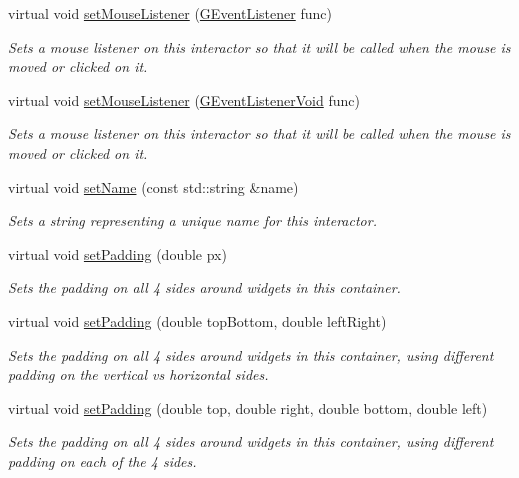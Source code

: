 \begin{DoxyCompactItemize}
virtual void \mbox{\hyperlink{classsgl_1_1GInteractor_a37d8dbc943f59920f705b0104f60bde2}{set\+Mouse\+Listener}} (\mbox{\hyperlink{namespacesgl_ae9f3e9eab70035da1a2b114e21357b25}{G\+Event\+Listener}} func)
\begin{DoxyCompactList}\small\item\em Sets a mouse listener on this interactor so that it will be called when the mouse is moved or clicked on it. \end{DoxyCompactList}\item 
virtual void \mbox{\hyperlink{classsgl_1_1GInteractor_aea7f647ea62d59f71b5fad6aa65eeaf9}{set\+Mouse\+Listener}} (\mbox{\hyperlink{namespacesgl_a54427ce97bb1c2804e4fe2b0a62e8b17}{G\+Event\+Listener\+Void}} func)
\begin{DoxyCompactList}\small\item\em Sets a mouse listener on this interactor so that it will be called when the mouse is moved or clicked on it. \end{DoxyCompactList}\item 
virtual void \mbox{\hyperlink{classsgl_1_1GInteractor_a9d3a2685df23b5e7cbf59c19c4a1f9b5}{set\+Name}} (const std\+::string \&name)
\begin{DoxyCompactList}\small\item\em Sets a string representing a unique name for this interactor. \end{DoxyCompactList}\item 
virtual void \mbox{\hyperlink{classsgl_1_1GContainer_a81b293e913c083a544af96f031668225}{set\+Padding}} (double px)
\begin{DoxyCompactList}\small\item\em Sets the padding on all 4 sides around widgets in this container. \end{DoxyCompactList}\item 
virtual void \mbox{\hyperlink{classsgl_1_1GContainer_a76dc599dd8828f0ab534ab0d1b0c5ef8}{set\+Padding}} (double top\+Bottom, double left\+Right)
\begin{DoxyCompactList}\small\item\em Sets the padding on all 4 sides around widgets in this container, using different padding on the vertical vs horizontal sides. \end{DoxyCompactList}\item 
virtual void \mbox{\hyperlink{classsgl_1_1GContainer_a9adbf36914b59c2ed3ed9aebe7adfc7e}{set\+Padding}} (double top, double right, double bottom, double left)
\begin{DoxyCompactList}\small\item\em Sets the padding on all 4 sides around widgets in this container, using different padding on each of the 4 sides. \end{DoxyCompactList}\item 

\end{DoxyCompactItemize}
